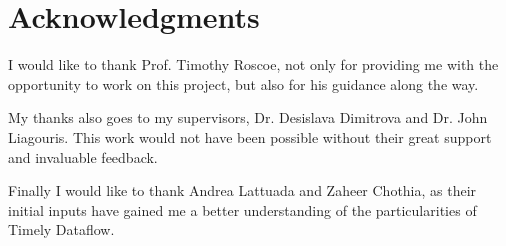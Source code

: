 
\begingroup
\chapter*{Acknowledgments}

I would like to thank Prof. Timothy Roscoe, not only for providing me with the
opportunity to work on this project, but also for his guidance along the way.

My thanks also goes to my supervisors, Dr. Desislava Dimitrova and Dr. John Liagouris.
This work would not have been possible without their great support and invaluable feedback.

Finally I would like to thank Andrea Lattuada and Zaheer Chothia, as their
initial inputs have gained me a better understanding of the particularities
of Timely Dataflow.

\endgroup
